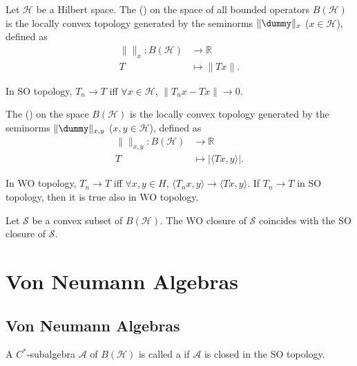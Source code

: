 \documentclass[openany, a5paper]{book}
\begin{document}
\begin{definition}%
	\label{def: strong-operator topology}
	Let $\mathcal H$ be a Hilbert space. 
	The  () on the space of all bounded operators $B(\mathcal H)$ is the locally convex topology generated by the seminorms $\|\dummy\|_x$ ($x \in \mathcal H$), defined as
	\begin{equation}
		\begin{aligned}
		\|\|_x \colon
		B(\mathcal H) &\to \mathbb R
		\\
		T &\mapsto  \|Tx\|.
		\end{aligned}
	\end{equation}
\end{definition}

In SO topology, $T_n \to T$ iff $\forall x \in \mathcal H$, $\|T_n x - Tx\| \to 0$.

\begin{definition}%
	\label{def: weak-operator topology}
	The  () on the space $B(\mathcal H)$ is the locally convex topology generated by the seminorms $\|\dummy\|_{x, y}$ ($x, y \in \mathcal H$), defined as
	\begin{equation}
		\begin{aligned}
		\|\|_{x, y} \colon
		B(\mathcal H) &\to \mathbb R
		\\
		T &\mapsto  |\langle Tx, y \rangle|.
		\end{aligned}
	\end{equation}
\end{definition}

In WO topology, $T_n \to T$ iff $\forall x, y \in H$, $\langle T_n x, y \rangle  \to \langle Tx, y \rangle$.
If $T_n \to T$ in SO topology, then it is true also in WO topology.

\begin{theorem}\label{thm: SO closure equals WO closure for convex set}
	Let $\mathscr S$ be a convex subset of $B(\mathcal H)$.
	The WO closure of $\mathscr S$ coincides with the SO closure of $\mathscr S$.
\end{theorem}


\chapter{Von Neumann Algebras}
\section{Von Neumann Algebras}
\begin{definition}
	A $C^*$-subalgebra $\mathscr A$ of $B(\mathcal H)$ is called a  if $\mathscr A$ is closed in the SO topology.
\end{definition}
\end{document}
